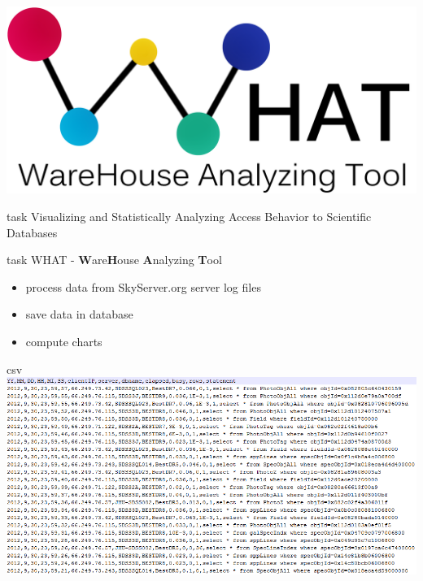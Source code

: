 \documentclass[xcolor=dvipsnames]{beamer}
\begin{document}

\begin{frame}
\begin{center}
\includegraphics[width =0.7\linewidth]{Pictures/WHAT-Logo2.png}
\end{center}

\end{frame}
% 



\begin{frame}{task}
Visualizing and Statistically Analyzing Access Behavior to Scientific Databases

\end{frame}


\begin{frame}{task}
 WHAT - \textbf{W}are\textbf{H}ouse \textbf{A}nalyzing \textbf{T}ool
\begin{itemize}
  \item<2-> process data from SkyServer.org server log files
  \item<3-> save data in database
  \item<4-> compute charts
\end{itemize}
\end{frame}

\begin{frame}{csv}
	\includegraphics[width=1\linewidth]{Pictures/csv.png}
\end{frame}
\end{document}
